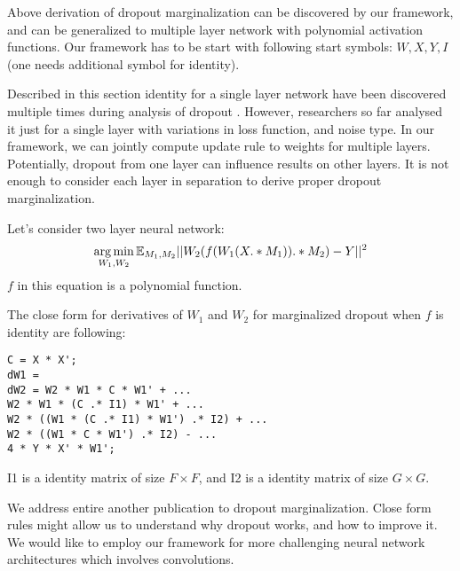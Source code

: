 Above derivation of dropout marginalization can be discovered by our framework, and can be generalized
to multiple layer network with polynomial activation functions. Our framework
has to be start with following start symbols: $W, X, Y, I$ (one needs additional symbol for identity).


Described in this section identity for a single layer network have been discovered multiple times during
analysis of dropout \cite{chen2013learning, chen2012marginalized, maaten2013learning}. 
However, researchers so far analysed it just for a single layer with variations in loss function, and noise type.
In our framework, we can jointly compute update rule to weights for multiple layers. 
Potentially, dropout from one layer can influence results on other layers. It is not enough
to consider each layer in separation to derive proper dropout marginalization.


Let's consider two layer neural network:
\begin{equation*}
  \operatorname*{arg\,min}_{W_1, W_2} \mathbb{E}_{M_1, M_2} ||W_2(f(W_1(X .* M_1)) .* M_2) - Y||^2
\end{equation*}
$f$ in this equation is a polynomial function. 

The close form for derivatives of $W_1$ and $W_2$ for marginalized 
dropout when $f$ is identity are following:
\begin{lstlisting}
C = X * X';
dW1 = 
dW2 = W2 * W1 * C * W1' + ...
W2 * W1 * (C .* I1) * W1' + ...
W2 * ((W1 * (C .* I1) * W1') .* I2) + ...
W2 * ((W1 * C * W1') .* I2) - ...
4 * Y * X' * W1';
\end{lstlisting}
I1 is a identity matrix of size $F \times F$, and I2 is a identity matrix of size $G \times G$.


We address entire another publication to dropout marginalization. Close form rules might
allow us to understand why dropout works, and how to improve it. We would like to 
employ our framework for more challenging neural network architectures which involves
convolutions.
